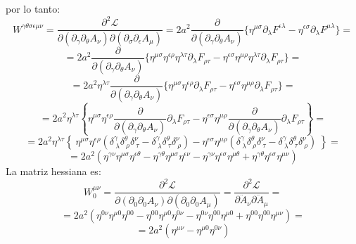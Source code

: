 \documentclass[a4paper,12pt]{article}
\begin{document}
por lo tanto:
\begin{equation}
W^{\gamma\theta\sigma\epsilon\mu\nu}= \frac{\partial^2\mathscr{L} }{\partial( \partial_\gamma\partial_\theta A_\nu)\partial(\partial_{\sigma}\partial_{\epsilon} A_\mu)}=2a^2\frac{\partial}{\partial( \partial_\gamma\partial_\theta A_\nu)} \{\eta^{\mu\sigma}\partial_\lambda F^{\epsilon\lambda}-\eta^{\epsilon\sigma}\partial_\lambda F^{\mu\lambda}\}=
\end{equation}
$$=2a^2\frac{\partial}{\partial( \partial_\gamma\partial_\theta A_\nu)} \{\eta^{\mu\sigma}\eta^{\epsilon\rho}\eta^{\lambda\tau}\partial_\lambda F_{\rho\tau}-\eta^{\epsilon\sigma}\eta^{\mu\rho}\eta^{\lambda\tau}\partial_\lambda F_{\rho\tau}\}=$$
$$=2a^2\eta^{\lambda\tau}\frac{\partial}{\partial( \partial_\gamma\partial_\theta A_\nu)} \{\eta^{\mu\sigma}\eta^{\epsilon\rho}\partial_\lambda F_{\rho\tau}-\eta^{\epsilon\sigma}\eta^{\mu\rho}\partial_\lambda F_{\rho\tau}\}=$$
$$=2a^2\eta^{\lambda\tau}\left\{\eta^{\mu\sigma}\eta^{\epsilon\rho}\frac{\partial}{\partial( \partial_\gamma\partial_\theta A_\nu)} \partial_\lambda F_{\rho\tau}-\eta^{\epsilon\sigma}\eta^{\mu\rho}\frac{\partial}{\partial( \partial_\gamma\partial_\theta A_\nu)} \partial_\lambda F_{\rho\tau}\right\}=$$
$$=2a^2\eta^{\lambda\tau}\left\{\ \eta^{\mu\sigma}\eta^{\epsilon\rho}(\delta^{\gamma}_{\ \lambda}\delta^{\theta}_{\ \rho}\delta^{\nu}_{\ \tau}-\delta^{\gamma}_{\ \lambda}\delta^{\theta}_{\ \tau}\delta^{\nu}_{\ \rho})-\eta^{\epsilon\sigma}\eta^{\mu\rho}(\delta^{\gamma}_{\ \lambda}\delta^{\theta}_{\ \rho}\delta^{\nu}_{\ \tau}-\delta^{\gamma}_{\ \lambda}\delta^{\theta}_{\ \tau}\delta^{\nu}_{\ \rho})\ \right\}=$$
$$=2a^2(\eta^{\gamma\nu}\eta^{\mu\sigma}\eta^{\epsilon\theta}-\eta^{\gamma\theta}\eta^{\mu\sigma}\eta^{\epsilon\nu}-\eta^{\gamma\nu}\eta^{\epsilon\sigma}\eta^{\mu\theta}+\eta^{\gamma\theta}\eta^{\epsilon\sigma}\eta^{\mu\nu})$$
La matriz hessiana es:
\begin{equation}
W^{\mu\nu}_0= \frac{\partial^2\mathscr{L} }{\partial( \partial_0\partial_0 A_\nu)\partial(\partial_{0}\partial_{0} A_\mu)}=\frac{\partial^2\mathscr{L} }{\partial\ddot A_\nu\partial\ddot A_\mu}=
\end{equation}
$$=2a^2(\eta^{0\nu}\eta^{\mu0}\eta^{00}-\eta^{00}\eta^{\mu0}\eta^{0\nu}-\eta^{0\nu}\eta^{00}\eta^{\mu0}+\eta^{00}\eta^{00}\eta^{\mu\nu}) =$$
$$=2a^2(\eta^{\mu\nu}-\eta^{\mu0}\eta^{0\nu}) $$
\vspace{0,4cm}

\\
\end{document}
